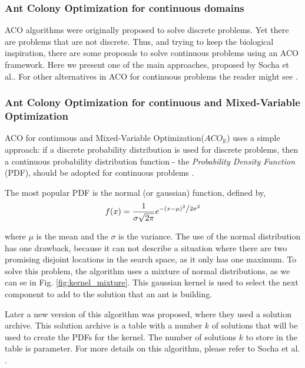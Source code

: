 					\subsubsection*{Ant Colony Optimization for continuous domains}
					ACO algorithms were originally proposed to solve discrete problems. Yet there are problems that are not discrete. Thus, and trying to keep the biological inspiration, there are some proposals to solve continuous problems using an ACO framework. 
					Here we present one of the main approaches, proposed by Socha et al.\cite{socha04}. For other alternatives in ACO for continuous problems the reader might see \cite{bilchev95, kong06, tsutsui04}.
					
					
					\subsubsection*{Ant Colony Optimization for continuous and Mixed-Variable Optimization}
					 ACO for continuous and Mixed-Variable Optimization($ACO_\mathbb{R}$) uses a simple approach: if a discrete probability distribution is used for discrete problems, then a continuous probability distribution function - the \emph{Probability Density Function} (PDF), should be adopted for continuous problems \cite{socha04}.

					The most popular PDF is the normal (or gaussian) function, defined by,
						\begin{equation}
							f(x) = \frac{1}{{\sigma \sqrt {2\pi } }}e^{{{ - \left( {x - \mu } \right)^2 } \mathord{\left/ 				{\vphantom {{ - \left( {x - \mu } \right)^2 } {2\sigma ^2 }}} \right. \kern-\nulldelimiterspace} {2\sigma ^2 }}}
						\end{equation}

					\noindent where $\mu$ is the mean and the $\sigma$ is the variance. The use of the normal distribution has one drawback, because it can not describe a situation where there are two promising disjoint locations in the search space, as it only has one maximum. To solve this problem, the algorithm uses a mixture of normal distributions, as we can se in Fig. \ref{fig:kernel_mixture}. This gaussian kernel is used to select the next component to add to the solution that an ant is building.

					 Later a new version of this algorithm was proposed, where they used a solution archive. This solution archive is a table with a number $k$ of solutions that will be used to create the PDFs for the kernel. The number of solutions $k$ to store in the table is parameter. For more details on this algorithm, please refer to Socha et al. \cite{socha08}.
					

